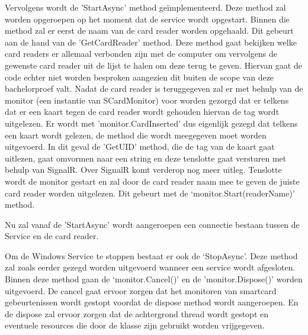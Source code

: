 Vervolgens wordt de 'StartAsync’ method geïmplementeerd. Deze method zal worden opgeroepen op het moment dat de service wordt opgestart. Binnen die method zal er eerst de naam van de card reader worden opgehaald. Dit gebeurt aan de hand van de 'GetCardReader’ method. Deze method gaat bekijken welke card readers er allemaal verbonden zijn met de computer om vervolgens de gewenste card reader uit de lijst te halen om deze terug te geven. Hiervan gaat de code echter niet worden besproken aangezien dit buiten de scope van deze bachelorproef valt. Nadat de card reader is teruggegeven zal er met behulp van de monitor (een instantie van SCardMonitor) voor worden gezorgd dat er telkens dat er een kaart tegen de card reader wordt gehouden hiervan de tag wordt uitgelezen. Er wordt met 'monitor.CardInserted’ dus eigenlijk gezegd dat telkens een kaart wordt gelezen, de method die wordt meegegeven moet worden uitgevoerd. In dit geval de 'GetUID’ method, die de tag van de kaart gaat uitlezen, gaat omvormen naar een string en deze tenslotte gaat versturen met behulp van SignalR. Over SignalR komt verderop nog meer uitleg. Tenslotte wordt de monitor gestart en zal door de card reader naam mee te geven de juiste card reader worden uitgelezen. Dit gebeurt met de ‘monitor.Start(readerName)’ method. 

Nu zal vanaf de 'StartAsync’ wordt aangeroepen een connectie bestaan tussen de Service en de card reader. 

Om de Windows Service te stoppen bestaat er ook de ‘StopAsync’. Deze method zal zoals eerder gezegd worden uitgevoerd wanneer een service wordt afgesloten. Binnen deze method gaan de ‘monitor.Cancel()’ en de 'monitor.Dispose()’ worden uitgevoerd. De cancel gaat ervoor zorgen dat het monitoren van smartcard gebeurtenissen wordt gestopt voordat de dispose method wordt aangeroepen. En de dispose zal ervoor zorgen dat de achtergrond thread wordt gestopt en eventuele resources die door de klasse zijn gebruikt worden vrijgegeven. 

